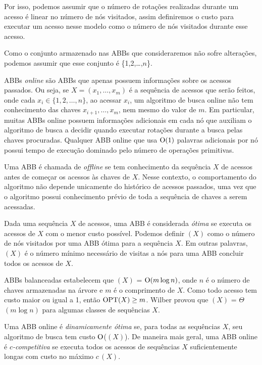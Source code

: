 Por isso, podemos assumir que o número de rotações realizadas durante um acesso é linear no número de nós visitados, assim definiremos o custo para executar um acesso nesse modelo como o número de nós visitados durante esse acesso.

Como o conjunto armazenado nas ABBs que consideraremos não sofre alterações, podemos assumir que esse conjunto é \{1,2,\ldots,$n$\}.

ABBs \textit{online} são ABBs que apenas possuem informações sobre os acessos passados. Ou seja, se $X = (x_1, \ldots, x_m)$ é a sequência de acessos que serão feitos, onde cada $x_i \in \{1,2,\ldots,n\}$, ao acessar $x_{i}$, um algoritmo de busca online não tem conhecimento das chaves $x_{i+1},\ldots,x_{m}$, nem mesmo do valor de $m$. Em particular, muitas ABBs online possuem informações adicionais em cada nó que auxiliam o algoritmo de busca a decidir quando executar rotações durante a busca pelas chaves procuradas. Qualquer ABB online que usa $\mathrm{O}(1)$ palavras adicionais por nó possui tempo de execução dominado pelo número de operações primitivas.

Uma ABB é chamada de \textit{offline} se tem conhecimento da sequência $X$ de acessos antes de começar os acessos às chaves de $X$. Nesse contexto, o comportamento do algoritmo não depende unicamente do histórico de acessos passados, uma vez que o algoritmo possui conhecimento prévio de toda a sequência de chaves a serem acessadas.

Dada uma sequência $X$ de acessos, uma ABB é considerada \textit{ótima} se executa os acessos de $X$ com o menor custo possível. Podemos definir \OPT$(X)$ como o número de nós visitados por uma ABB ótima para a sequência $X$. Em outras palavras, \OPT$(X)$ é o número mínimo necessário de visitas a nós para uma ABB concluir todos os acessos de $X$. 

ABBs balanceadas estabelecem que \OPT$(X)$ = $\mathrm{O}(m \log n)$, onde $n$ é o número de chaves armazenadas na árvore e $m$ é o comprimento de $X$. Como todo acesso tem custo maior ou igual a 1, então $\text{\ensuremath{\mathrm{OPT}}}(X) \geq m$. Wilber \cite{lowerbound_wilber} provou que \OPT$(X)$ = $\Theta$$(m \log n)$ para algumas classes de sequências $X$. 

Uma ABB online é \textit{dinamicamente ótima} se, para todas as sequências $X$, seu algoritmo de busca tem custo $\mathrm{O}$(\OPT$(X)$). De maneira mais geral, uma ABB online é \textit{$c$-competitiva} se executa todos os acessos de sequências $X$ suficientemente longas com custo no máximo $c$\,\OPT$(X)$.

